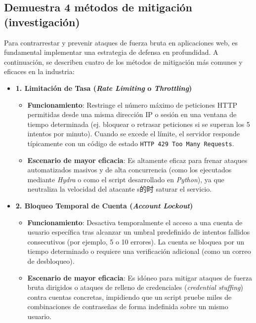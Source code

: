 \documentclass[letter,12pt]{article}
\begin{document}
\newpage
\subsection{Demuestra 4 métodos de mitigación (investigación)}

Para contrarrestar y prevenir ataques de fuerza bruta en aplicaciones web, es fundamental implementar una estrategia de defensa en profundidad. A continuación, se describen cuatro de los métodos de mitigación más comunes y eficaces en la industria:

\begin{itemize}
    \item \textbf{1. Limitación de Tasa (\textit{Rate Limiting} o \textit{Throttling})}
    \begin{itemize}
        \item \textbf{Funcionamiento}: Restringe el número máximo de peticiones HTTP permitidas desde una misma dirección IP o sesión en una ventana de tiempo determinada (ej. bloquear o retrasar peticiones si se superan los 5 intentos por minuto). Cuando se excede el límite, el servidor responde típicamente con un código de estado \texttt{HTTP 429 Too Many Requests}.
        \item \textbf{Escenario de mayor eficacia}: Es altamente eficaz para frenar ataques automatizados masivos y de alta concurrencia (como los ejecutados mediante \textit{Hydra} o como el script desarrollado en \textit{Python}), ya que neutraliza la velocidad del atacante s的时 saturar el servicio.
    \end{itemize}

    \item \textbf{2. Bloqueo Temporal de Cuenta (\textit{Account Lockout})}
    \begin{itemize}
        \item \textbf{Funcionamiento}: Desactiva temporalmente el acceso a una cuenta de usuario específica tras alcanzar un umbral predefinido de intentos fallidos consecutivos (por ejemplo, 5 o 10 errores). La cuenta se bloquea por un tiempo determinado o requiere una verificación adicional (como un correo de desbloqueo).
        \item \textbf{Escenario de mayor eficacia}: Es idóneo para mitigar ataques de fuerza bruta dirigidos o ataques de relleno de credenciales (\textit{credential stuffing}) contra cuentas concretas, impidiendo que un script pruebe miles de combinaciones de contraseñas de forma indefinida sobre un mismo usuario.
    \end{itemize}


\end{itemize}
\end{document}
